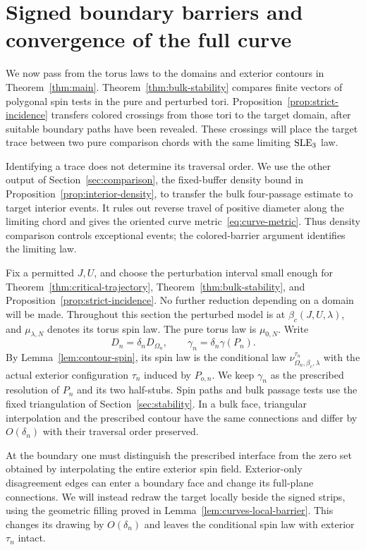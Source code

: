 \section{Signed boundary barriers and convergence of the full curve}
\label{sec:curves}

We now pass from the torus laws to the domains and exterior contours in
Theorem~\ref{thm:main}.  Theorem~\ref{thm:bulk-stability} compares finite
vectors of polygonal spin tests in the pure and perturbed tori.
Proposition~\ref{prop:strict-incidence} transfers colored crossings from
those tori to the target domain, after suitable boundary paths have been
revealed.  These crossings will place the target trace between two pure
comparison chords with the same limiting $\operatorname{SLE}_3$ law.

Identifying a trace does not determine its traversal order.  We use the
other output of Section~\ref{sec:comparison}, the fixed-buffer density
bound in Proposition~\ref{prop:interior-density}, to transfer the bulk
four-passage estimate to target interior events.  It rules out reverse
travel of positive diameter along the limiting chord and gives the
oriented curve metric~\eqref{eq:curve-metric}.  Thus density comparison
controls exceptional events; the colored-barrier argument identifies the
limiting law.

Fix a permitted $J,U$, and choose the perturbation interval small enough
for Theorem~\ref{thm:critical-trajectory}, Theorem~\ref{thm:bulk-stability},
and Proposition~\ref{prop:strict-incidence}.  No further reduction depending
on a domain will be made.  Throughout this section the perturbed model is
at $\beta_c(J,U,\lambda)$, and $\mu_{\lambda,N}$ denotes its torus spin
law.  The pure torus law is $\mu_{0,N}$.  Write
\[
 D_n=\delta_n D_{\Omega_n},\qquad
 \gamma_n=\delta_n\gamma(P_n).
\]
By Lemma~\ref{lem:contour-spin}, its spin law is the conditional law
$\nu_{\Omega_n,\beta_c,\lambda}^{\tau_n}$ with the actual exterior
configuration $\tau_n$ induced by $P_{o,n}$.  We keep $\gamma_n$ as the
prescribed resolution of $P_n$ and its two half-stubs.  Spin paths and
bulk passage tests use the fixed triangulation of
Section~\ref{sec:stability}.  In a bulk face, triangular interpolation
and the prescribed contour have the same connections and differ by
$O(\delta_n)$ with their traversal order preserved.

At the boundary one must distinguish the prescribed interface from the
zero set obtained by interpolating the entire exterior spin field.
Exterior-only disagreement edges can enter a boundary face and change
its full-plane connections.  We will instead redraw the target locally
beside the signed strips, using the geometric filling proved in
Lemma~\ref{lem:curves-local-barrier}.  This changes its drawing by
$O(\delta_n)$ and leaves the conditional spin law with exterior
$\tau_n$ intact.

